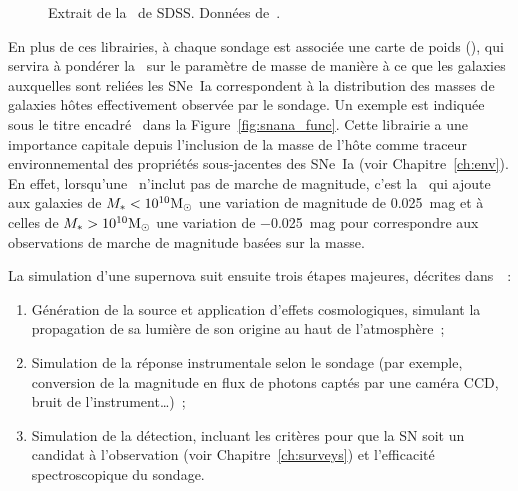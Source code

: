 \documentclass[../main/main.tex]{subfiles}
\begin{document}
\begin{figure}[ht]
    \centering
    \begin{minipage}{0.75\linewidth}
    \end{minipage}
    \caption[Extrait de la \simlib\ de SDSS]{Extrait de la \simlib\ de SDSS.
    Données de~\cite{kessler2013}.}
    \label{fig:sdssimlib}
\end{figure}

En plus de ces librairies, à chaque sondage est associée une carte de poids
(\wgtmap), qui servira à pondérer la \hostlib\ sur le paramètre de masse de
manière à ce que les galaxies auxquelles sont reliées les SNe~Ia correspondent à
la distribution des masses de galaxies hôtes effectivement observée par le
sondage. Un exemple est indiquée sous le titre encadré \wgtmap\ dans la
Figure~\ref{fig:snana_func}. Cette librairie a une importance capitale depuis
l'inclusion de la masse de l'hôte comme traceur environnemental des propriétés
sous-jacentes des SNe~Ia (voir Chapitre~\ref{ch:env}). En effet, lorsqu'une
\hostlib\ n'inclut pas de marche de magnitude, c'est la \wgtmap\ qui ajoute aux
galaxies de $M_* < 10^{10}\si{\Msun}$ une variation de magnitude de
\SI{0.025}{mag} et à celles de $M_* > 10^{10}\si{\Msun}$ une variation de
\SI{-0.025}{mag} pour correspondre aux observations de marche de magnitude
basées sur la masse.

La simulation d'une supernova suit ensuite trois étapes majeures, décrites
dans~\cite{kessler2019}~:
\begin{enumerate}
    \item Génération de la source et application d'effets cosmologiques,
        simulant la propagation de sa lumière de son origine au haut de
        l'atmosphère~;
    \item Simulation de la réponse instrumentale selon le sondage (par exemple,
        conversion de la magnitude en flux de photons captés par une caméra CCD,
        bruit de l'instrument…)~;
    \item Simulation de la détection, incluant les critères pour que la SN soit
        un candidat à l'observation (voir Chapitre~\ref{ch:surveys}) et
        l'efficacité spectroscopique du sondage.
\end{enumerate}
\end{document}
